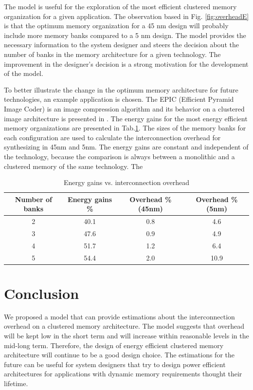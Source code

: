 The model is useful for the exploration of the most efficient clustered memory organization for a given application. 
The observation based in Fig. \ref{fig:overheadE} is that the optimum memory organization for a 45 nm design will probably include more memory banks compared to a 5 nm design.
The model provides the necessary information to the system designer and steers the decision about the number of banks in the memory architecture for a given technology.
The improvement in the designer's decision is a strong motivation for the development of the model. 

To better illustrate the change in the optimum memory architecture for future technologies, an example application is chosen.
The EPIC (Efficient Pyramid Image Coder) is an image compression algorithm and its behavior on a clustered image architecture is presented in \cite{filippopoulos2013exploration}.
The energy gains for the most energy efficient memory organizations are presented in Tab.\ref{tab:GainvsOverhead}.
The sizes of the memory banks for each configuration are used to calculate the interconnection overhead for synthesizing in 45nm and 5nm.
The energy gains are constant and independent of the technology, because the comparison is always between a monolithic and a clustered memory of the same technology.
The 

\begin{center}
	\begin{table}
	\caption{Energy gains vs. interconnection overhead}
	\label{tab:GainvsOverhead}
	{
	\begin{tabular}{|c|c|c|c|}
	\hline
	Number of banks & Energy gains \% & Overhead \% (45nm) & Overhead \% (5nm) \\
	\hline
	2 & 40.1  & 0.8 & 4.6 \\
	\hline 
	3 & 47.6  & 0.9 & 4.9 \\
	\hline 
	4 & 51.7 & 1.2 & 6.4 \\
	\hline
	5 & 54.4 & 2.0 & 10.9 \\
	\hline	
	\end{tabular}}
	\end{table}
\end{center}


  
\section{Conclusion}

We proposed a model that can provide estimations about the interconnection overhead on a clustered memory architecture.
The model suggests that overhead will be kept low in the short term and will increase within reasonable levels in the mid-long term.
Therefore, the design of energy efficient clustered memory architecture will continue to be a good design choice.
The estimations for the future can be useful for system designers that try to design power efficient architectures for applications with dynamic memory requirements thought their lifetime.





%
